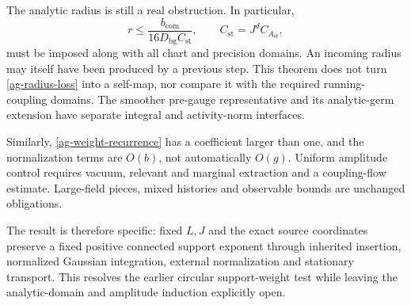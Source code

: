 The analytic radius is still a real obstruction. In particular,
\begin{equation}\label{ag-radius-loss}
 r\le\frac{b_{\mathrm{com}}}{16D_{\mathrm{bg}}C_{\mathrm{st}}},
 \qquad C_{\mathrm{st}}=J^dC_{A_{\mathrm{st}}},
\end{equation}
must be imposed along with all chart and precision domains.
An incoming radius may itself have been produced by a
previous step. This theorem does not turn
\eqref{ag-radius-loss} into a self-map, nor compare it with
the required running-coupling domains. The smoother pre-gauge
representative and its analytic-germ extension have separate
integral and activity-norm interfaces.

Similarly, \eqref{ag-weight-recurrence} has a coefficient
larger than one, and the normalization terms are $O(b)$,
not automatically $O(g)$. Uniform amplitude control requires
vacuum, relevant and marginal extraction and a coupling-flow
estimate. Large-field pieces, mixed histories and observable
bounds are unchanged obligations.

The result is therefore specific: fixed $L,J$ and the exact
source coordinates preserve a fixed positive connected
support exponent through inherited insertion, normalized
Gaussian integration, external normalization and stationary
transport. This resolves the earlier circular support-weight
test while leaving the analytic-domain and amplitude induction
explicitly open.
